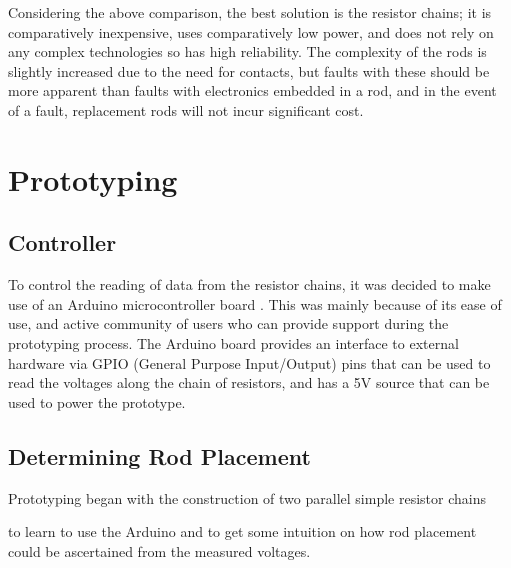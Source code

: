  
Considering the above comparison, the best solution is the resistor chains; it is comparatively inexpensive, uses comparatively low power, and does not rely on any complex technologies so has high reliability. The complexity of the rods is slightly increased due to the need for contacts, but faults with these should be more apparent than faults with electronics embedded in a rod, and in the event of a fault, replacement rods will not incur significant cost.\\




\section{Prototyping}

\subsection{Controller}
To control the reading of data from the resistor chains, it was decided to make use of an Arduino microcontroller board \cite{ArduinoH73:online}. This was mainly because of its ease of use, and active community of users who can provide support during the prototyping process. The Arduino board provides an interface to external hardware via GPIO (General Purpose Input/Output) pins that can be used to read the voltages along the chain of resistors, and has a 5V source that can be used to power the prototype. 

\subsection{Determining Rod Placement}
\label{sec:voltages}
Prototyping began with the construction of two parallel simple resistor chains  to learn to use the Arduino and to get some intuition on how rod placement could be ascertained from the measured voltages. 


